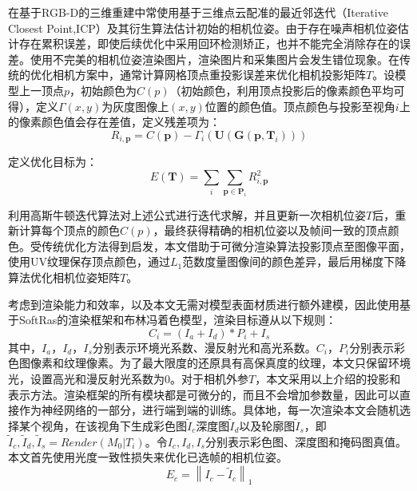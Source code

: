 在基于RGB-D的三维重建中常使用基于三维点云配准的最近邻迭代（Iterative Closest Point,ICP）及其衍生算法估计初始的相机位姿。由于存在噪声相机位姿估计存在累积误差，即使后续优化中采用回环检测矫正，也并不能完全消除存在的误差。使用不完美的相机位姿渲染图片，渲染图片和采集图片会发生错位现象。在传统的优化相机方案中，通常计算网格顶点重投影误差来优化相机投影矩阵$T$。设模型上一顶点$p$，初始颜色为$C(p)$（初始颜色，利用顶点投影后的像素颜色平均可得），定义$\Gamma(x,y) $为灰度图像上$(x,y)$位置的颜色值。顶点颜色与投影至视角$i$上的像素颜色值会存在差值，定义残差项为：
\begin{equation}
	R_{i, \mathbf{p}}=C(\mathbf{p})-\Gamma_{i}\left(\mathbf{U}\left(\mathbf{G}\left(\mathbf{p}, \mathbf{T}_{i}\right)\right)\right)
\end{equation} \par
定义优化目标为：
\begin{equation}
	E(\mathbf{T})=\sum_{i} \sum_{\mathbf{p} \in \mathbf{P}_{i}} R_{i, \mathbf{p}}^{2}
\end{equation}

利用高斯牛顿迭代算法对上述公式进行迭代求解，并且更新一次相机位姿$T$后，重新计算每个顶点的颜色$C(p)$，最终获得精确的相机位姿以及帧间一致的顶点颜色。受传统优化方法得到启发，本文借助于可微分渲染算法投影顶点至图像平面，使用UV纹理保存顶点颜色，通过$L_1$范数度量图像间的颜色差异，最后用梯度下降算法优化相机位姿矩阵$T$。\par
考虑到渲染能力和效率，以及本文无需对模型表面材质进行额外建模，因此使用基于SoftRas的渲染框架和布林冯着色模型，渲染目标遵从以下规则：
\begin{equation}
	C_i = (I_a + I_d) * P_i + I_s
\end{equation}
其中，$I_a$，$I_d$，$I_s$分别表示环境光系数、漫反射光和高光系数。$C_i$，$P_i$分别表示彩色图像素和纹理像素。为了最大限度的还原具有高保真度的纹理，本文只保留环境光，设置高光和漫反射光系数为0。对于相机外参$T$，本文采用以上介绍的投影和表示方法。渲染框架的所有模块都是可微分的，而且不会增加参数量，因此可以直接作为神经网络的一部分，进行端到端的训练。具体地，每一次渲染本文会随机选择某个视角，在该视角下生成彩色图$\tilde{I}_c$深度图$\tilde{I}_d$以及轮廓图$\tilde{I}_s$，即$\tilde{I}_c,\tilde{I}_d,\tilde{I}_s = Render(M_0|T_i)$。令$I_c, I_d, I_s$分别表示彩色图、深度图和掩码图真值。本文首先使用光度一致性损失来优化已选帧的相机位姿。
\begin{equation}
	E_c = \left \| I_c - \tilde{I}_c  \right \|_1 
\end{equation}

